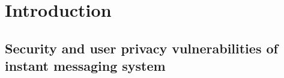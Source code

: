 \chapter{Introduction}\label{ch:introduction}


\newcommand{\keyword}[1]{\textbf{#1}}
\newcommand{\tabhead}[1]{\textbf{#1}}
\newcommand{\code}[1]{\texttt{#1}}
\newcommand{\file}[1]{\texttt{\bfseries#1}}
\newcommand{\option}[1]{\texttt{\itshape#1}}



\section{Security and user privacy vulnerabilities of instant messaging system}
\label{sec:security-and-user-privacy-vulnerabilities-of-instant-messaging-system}


